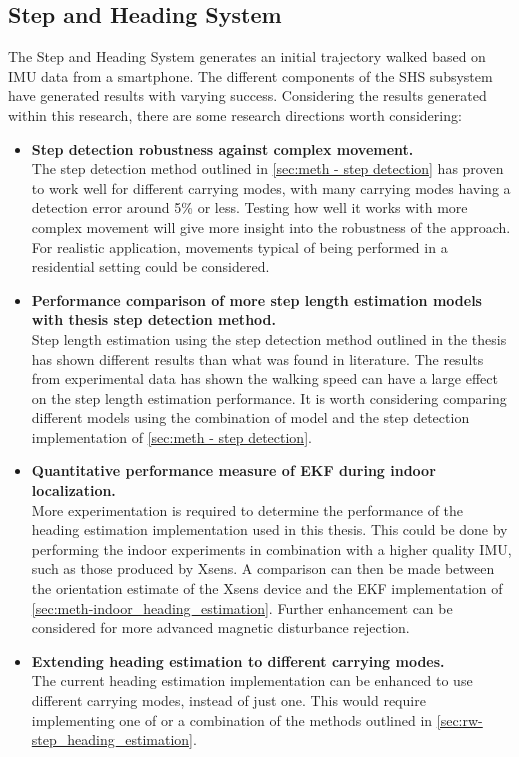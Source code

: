 \subsection{Step and Heading System }

The Step and Heading System generates an initial trajectory walked based on IMU data from a smartphone. The different components of the \ac{SHS} subsystem have generated results with varying success. Considering the results generated within this research, there are some research directions worth considering:

\begin{itemize}
	\item \textbf{Step detection robustness against complex movement.} \\
	The step detection method outlined in \cref{sec:meth - step detection} has proven to work well for different carrying modes, with many carrying modes having a detection error around 5\% or less. Testing how well it works with more complex movement will give more insight into the robustness of the approach. For realistic application, movements typical of being performed in a residential setting could be considered.
	
	\item \textbf{Performance comparison of more step length estimation models with thesis step detection method.} \\
	Step length estimation using the step detection method outlined in the thesis has shown different results than what was found in literature. The results from experimental data has shown the walking speed can have a large effect on the step length estimation performance. It is worth considering comparing different models using the combination of model and the step detection implementation of \cref{sec:meth - step detection}. 
	
	\item \textbf{Quantitative performance measure of EKF during indoor localization.}\\
	More experimentation is required to determine the performance of the heading estimation implementation used in this thesis. This could be done by performing the indoor experiments in combination with a higher quality \ac{IMU}, such as those produced by Xsens. A comparison can then be made between the orientation estimate of the Xsens device and the EKF implementation of \cref{sec:meth-indoor_heading_estimation}. Further enhancement can be considered for more advanced magnetic disturbance rejection.
	
	\item \textbf{Extending heading estimation to different carrying modes.}\\
	The current heading estimation implementation can be enhanced to use different carrying modes, instead of just one. This would require implementing one of or a combination of the methods outlined in \cref{sec:rw-step_heading_estimation}.
	
\end{itemize}

